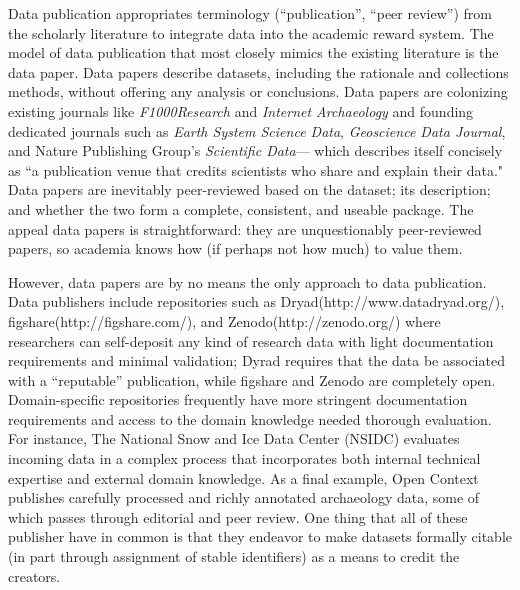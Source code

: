 \documentclass[10pt]{article}
\begin{document}
Data publication appropriates terminology (``publication'', ``peer review'') from the scholarly literature to integrate data into the academic reward system\cite{costello_motivating_2009, lawrence_data_2011, atici_other_2012}.
The model of data publication that most closely mimics the existing literature is the data paper.
Data papers describe datasets, including the rationale and collections methods, without offering any analysis or conclusions\cite{newman_data_2009, callaghan_processes_2013}.
Data papers are colonizing existing journals like \emph{F1000Research} and \emph{Internet Archaeology} and founding dedicated journals such as \emph{Earth System Science Data}, \emph{Geoscience Data Journal}\cite{allan_geoscience_2014}, and Nature Publishing Group's \emph{Scientific Data}--- which describes itself concisely as ``a publication venue that credits scientists who share and explain their data." \cite{_more_2014}
Data papers are inevitably peer-reviewed based on the dataset; its description; and whether the two form a complete, consistent, and useable package\cite{lawrence_data_2011}.
The appeal data papers is straightforward: they are unquestionably peer-reviewed papers, so academia knows how (if perhaps not how much) to value them.

However, data papers are by no means the only approach to data publication.
Data publishers include repositories such as Dryad(http://www.datadryad.org/), figshare(http://figshare.com/), and Zenodo(http://zenodo.org/) where researchers can self-deposit any kind of research data with light documentation requirements and minimal validation; Dyrad requires that the data be associated with a ``reputable'' publication, while figshare and Zenodo are completely open.
Domain-specific repositories frequently have more stringent documentation requirements and access to the domain knowledge needed thorough evaluation.
For instance, The National Snow and Ice Data Center (NSIDC) evaluates incoming data in a complex process that incorporates both internal technical expertise and external domain knowledge\cite{weaver_data_2012}.
As a final example, Open Context publishes carefully processed and richly annotated archaeology data, some of which passes through editorial and peer review\cite{kansa_we_2014}.
One thing that all of these publisher have in common is that they endeavor to make datasets formally citable (in part through assignment of stable identifiers) as a means to credit the creators.
\end{document}
